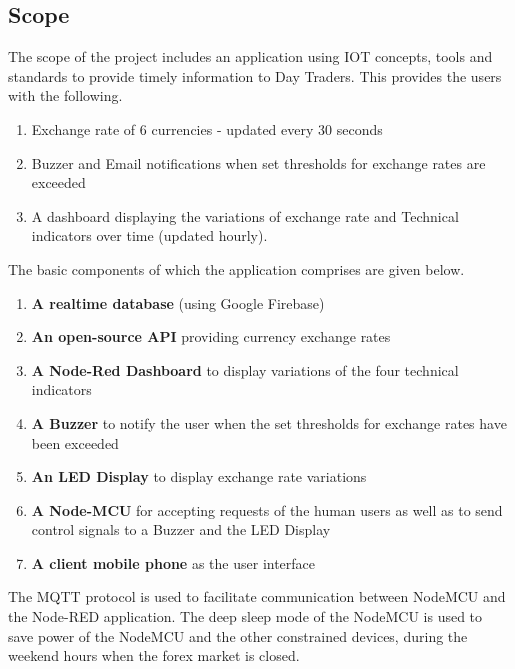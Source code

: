 \subsection{Scope}

The scope of the project includes an application using IOT concepts, tools and standards to provide timely information to Day Traders. This provides the users with the following.

\begin{enumerate}[itemsep=-1.7mm]
\item Exchange rate of 6 currencies - updated every 30 seconds
\item Buzzer and Email notifications when set thresholds for exchange rates are exceeded
\item A dashboard displaying the variations of exchange rate and Technical indicators over time (updated hourly).
\end{enumerate}

The basic components of which the application comprises are given below.

\begin{enumerate}[itemsep=-1.7mm]
\item \textbf{A realtime database} (using Google Firebase)
\item \textbf{An open-source API} providing currency exchange rates 
\item \textbf{A Node-Red Dashboard} to display variations of the four technical indicators
\item \textbf{A Buzzer} to notify the user when the set thresholds for exchange rates have been exceeded
\item \textbf{An LED Display}  to display exchange rate variations
\item \textbf{A Node-MCU}  for accepting requests of the human users as well as to send control signals to a Buzzer and the LED Display
\item \textbf{A client mobile phone} as the user interface
\end{enumerate}

The MQTT protocol is used to facilitate communication between NodeMCU and the Node-RED application. The deep sleep mode of the NodeMCU is used to save power of the NodeMCU and the other constrained devices, during the weekend hours when the forex market is closed.

